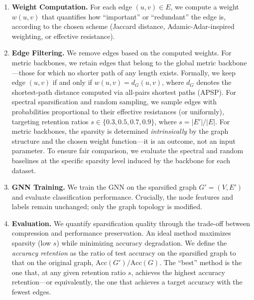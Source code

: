 \documentclass[conference]{IEEEtran}
\begin{document}
\begin{enumerate}
    \item \textbf{Weight Computation.} For each edge $(u, v) \in E$, we compute a weight $w(u, v)$ that quantifies how ``important'' or ``redundant'' the edge is, according to the chosen scheme (Jaccard distance, Adamic-Adar-inspired weighting, or effective resistance).
    \item \textbf{Edge Filtering.} We remove edges based on the computed weights. For metric backbones, we retain edges that belong to the global metric backbone---those for which no shorter path of any length exists. Formally, we keep edge $(u,v)$ if and only if $w(u,v) = d_G(u,v)$, where $d_G$ denotes the shortest-path distance computed via all-pairs shortest paths (APSP). For spectral sparsification and random sampling, we sample edges with probabilities proportional to their effective resistances (or uniformly), targeting retention ratios $s \in \{0.3, 0.5, 0.7, 0.9\}$, where $s = |E'| / |E|$. For metric backbones, the sparsity is determined \emph{intrinsically} by the graph structure and the chosen weight function---it is an outcome, not an input parameter. To ensure fair comparison, we evaluate the spectral and random baselines at the specific sparsity level induced by the backbone for each dataset.
    \item \textbf{GNN Training.} We train the GNN on the sparsified graph $G' = (V, E')$ and evaluate classification performance. Crucially, the node features and labels remain unchanged; only the graph topology is modified.
    \item \textbf{Evaluation.} We quantify sparsification quality through the trade-off between compression and performance preservation. An ideal method maximizes sparsity (low $s$) while minimizing accuracy degradation. We define the \emph{accuracy retention} as the ratio of test accuracy on the sparsified graph to that on the original graph, $\text{Acc}(G') / \text{Acc}(G)$. The ``best'' method is the one that, at any given retention ratio $s$, achieves the highest accuracy retention---or equivalently, the one that achieves a target accuracy with the fewest edges.
\end{enumerate}
\end{document}
